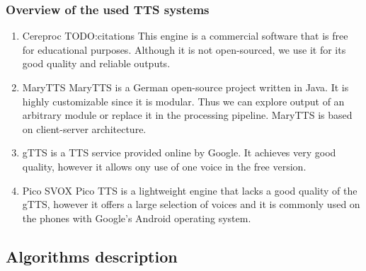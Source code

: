\subsubsection*{Overview of the used TTS systems}
\begin{enumerate}
\item Cereproc TODO:citations
This engine is a commercial software that is free for educational purposes.
Although it is not open-sourced, we use it for its good quality and reliable outputs.
\item MaryTTS
MaryTTS is a German open-source project written in Java.
It is highly customizable since it is modular.
Thus we can explore output of an arbitrary module or replace it in the processing pipeline.
MaryTTS is based on client-server architecture.
\item gTTS is a TTS service provided online by Google.
It achieves very good quality, however it allows ony use of one voice in the free version.
\item Pico
SVOX Pico TTS is a lightweight engine that lacks a good quality of the gTTS, however it offers a large selection of voices and it is commonly used on the phones with Google's Android operating system.

\end{enumerate}
\subsection{Algorithms description}
